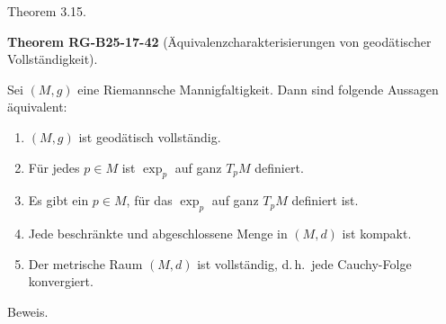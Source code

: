 \documentclass[10pt, letterpaper]{article}
\newcommand{\CustomHeading}[3]{%
  \par\medskip\noindent%
  \textbf{#1 #2} \textnormal{(#3)}.\enskip%
}
\newenvironment{THEO}[2]{\begin{unitbox}\CustomHeading{Theorem}{#1}{#2}}{\end{unitbox}}
\begin{document}
Theorem 3.15. 

\begin{THEO}{RG-B25-17-42}{Äquivalenzcharakterisierungen von geodätischer Vollständigkeit}
Sei $(M, g)$ eine Riemannsche Mannigfaltigkeit. Dann sind folgende Aussagen äquivalent:
\begin{enumerate}
  \item $(M, g)$ ist geodätisch vollständig.
  \item Für jedes $p \in M$ ist $\exp_{p}$ auf ganz $T_p M$ definiert.
  \item Es gibt ein $p \in M$, für das $\exp_{p}$ auf ganz $T_p M$ definiert ist.
  \item Jede beschränkte und abgeschlossene Menge in $(M, d)$ ist kompakt.
  \item Der metrische Raum $(M, d)$ ist vollständig, d.\,h.\ jede Cauchy-Folge konvergiert.
\end{enumerate}
\end{THEO}

Beweis. 
\end{document}

